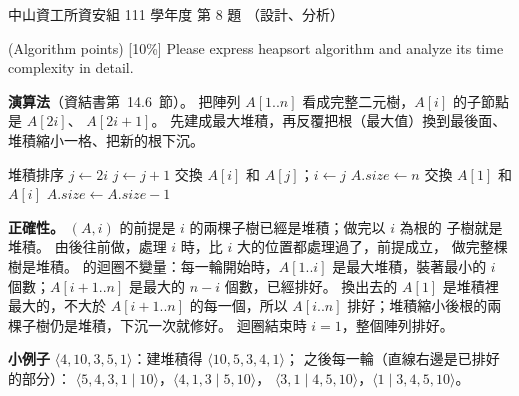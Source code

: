 \begin{pastexam}[label={px:nsysu-111-dmalg-05}]{中山資工所資安組 111 學年度 第 8 題}
（設計、分析）

(Algorithm points) {[10\%]} Please express heapsort algorithm and analyze its time complexity in detail.
\end{pastexam}

\begin{pastsoln}
\textbf{演算法}（資結書第~14.6~節）。 把陣列 $A[1..n]$ 看成完整二元樹，$A[i]$ 的子節點是 $A[2i]$、
$A[2i+1]$。 先建成最大堆積，再反覆把根（最大值）換到最後面、堆積縮小一格、把新的根下沉。
\begin{pseudo}[unbreakable]{堆積排序}
        \State $j \gets 2i$
            \State $j \gets j + 1$ 
        \EndIf
            \State \Return
        \EndIf
        \State 交換 $A[i]$ 和 $A[j]$；$i \gets j$
    \EndWhile
\EndProcedure
\Statex
{}
    \State $A.\mathit{size} \gets n$
        \State {}
    \EndFor
\EndProcedure
\Statex
{}
    \State {}
        \State 交換 $A[1]$ 和 $A[i]$ 
        \State $A.\mathit{size} \gets A.\mathit{size} - 1$
        \State {}
    \EndFor
\EndProcedure
\end{pseudo}
\textbf{正確性。} $(A, i)$ 的前提是 $i$ 的兩棵子樹已經是堆積；做完以 $i$ 為根的
子樹就是堆積。  由後往前做，處理 $i$ 時，比 $i$ 大的位置都處理過了，前提成立，
做完整棵樹是堆積。  的迴圈不變量：每一輪開始時，$A[1..i]$ 是最大堆積，裝著最小的
$i$ 個數；$A[i+1..n]$ 是最大的 $n - i$ 個數，已經排好。 換出去的 $A[1]$ 是堆積裡最大的，不大於
$A[i+1..n]$ 的每一個，所以 $A[i..n]$ 排好；堆積縮小後根的兩棵子樹仍是堆積，下沉一次就修好。
迴圈結束時 $i = 1$，整個陣列排好。

\textbf{小例子} $\langle 4, 10, 3, 5, 1\rangle$：建堆積得 $\langle 10, 5, 3, 4, 1\rangle$；
之後每一輪（直線右邊是已排好的部分）：
$\langle 5, 4, 3, 1 \mid 10\rangle$，$\langle 4, 1, 3 \mid 5, 10\rangle$，
$\langle 3, 1 \mid 4, 5, 10\rangle$，$\langle 1 \mid 3, 4, 5, 10\rangle$。


\end{pastsoln}
